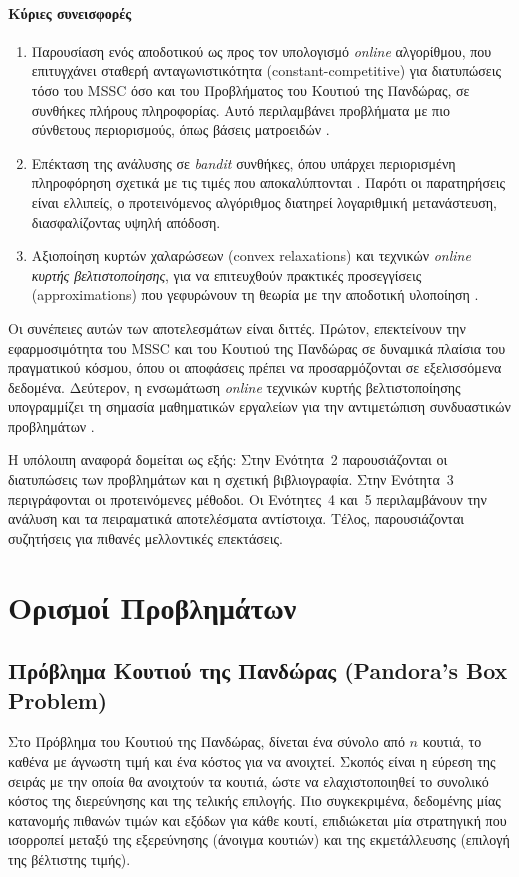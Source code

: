\documentclass[11pt,a4paper]{article}
\begin{document}
\paragraph{Κύριες συνεισφορές}
\begin{enumerate}
    \item Παρουσίαση ενός αποδοτικού ως προς τον υπολογισμό \textit{online} αλγορίθμου, που επιτυγχάνει σταθερή ανταγωνιστικότητα (constant-competitive) για διατυπώσεις τόσο του MSSC όσο και του Προβλήματος του Κουτιού της Πανδώρας, σε συνθήκες πλήρους πληροφορίας. Αυτό περιλαμβάνει προβλήματα με πιο σύνθετους περιορισμούς, όπως βάσεις ματροειδών \cite{bansal2010constant}.
    \item Επέκταση της ανάλυσης σε \textit{bandit} συνθήκες, όπου υπάρχει περιορισμένη πληροφόρηση σχετικά με τις τιμές που αποκαλύπτονται \cite{flaxman2004online}. Παρότι οι παρατηρήσεις είναι ελλιπείς, ο προτεινόμενος αλγόριθμος διατηρεί λογαριθμική μετανάστευση, διασφαλίζοντας υψηλή απόδοση.
    \item Αξιοποίηση κυρτών χαλαρώσεων (convex relaxations) και τεχνικών \textit{online κυρτής βελτιστοποίησης}, για να επιτευχθούν πρακτικές προσεγγίσεις (approximations) που γεφυρώνουν τη θεωρία με την αποδοτική υλοποίηση \cite{shalev2007primal}.
\end{enumerate}

Οι συνέπειες αυτών των αποτελεσμάτων είναι διττές. Πρώτον, επεκτείνουν την εφαρμοσιμότητα του MSSC και του Κουτιού της Πανδώρας σε δυναμικά πλαίσια του πραγματικού κόσμου, όπου οι αποφάσεις πρέπει να προσαρμόζονται σε εξελισσόμενα δεδομένα. Δεύτερον, η ενσωμάτωση \textit{online} τεχνικών κυρτής βελτιστοποίησης υπογραμμίζει τη σημασία μαθηματικών εργαλείων για την αντιμετώπιση συνδυαστικών προβλημάτων \cite{gergatsouli2022online}.

Η υπόλοιπη αναφορά δομείται ως εξής: Στην Ενότητα~2 παρουσιάζονται οι διατυπώσεις των προβλημάτων και η σχετική βιβλιογραφία. Στην Ενότητα~3 περιγράφονται οι προτεινόμενες μέθοδοι. Οι Ενότητες~4 και~5 περιλαμβάνουν την ανάλυση και τα πειραματικά αποτελέσματα αντίστοιχα. Τέλος, παρουσιάζονται συζητήσεις για πιθανές μελλοντικές επεκτάσεις.

\pagebreak

\section{Ορισμοί Προβλημάτων}
\subsection{Πρόβλημα Κουτιού της Πανδώρας (Pandora’s Box Problem)}
Στο Πρόβλημα του Κουτιού της Πανδώρας, δίνεται ένα σύνολο από \( n \) κουτιά, το καθένα με άγνωστη τιμή και ένα κόστος για να ανοιχτεί. Σκοπός είναι η εύρεση της σειράς με την οποία θα ανοιχτούν τα κουτιά, ώστε να ελαχιστοποιηθεί το συνολικό κόστος της διερεύνησης και της τελικής επιλογής. Πιο συγκεκριμένα, δεδομένης μίας κατανομής πιθανών τιμών και εξόδων για κάθε κουτί, επιδιώκεται μία στρατηγική που ισορροπεί μεταξύ της εξερεύνησης (άνοιγμα κουτιών) και της εκμετάλλευσης (επιλογή της βέλτιστης τιμής).
\end{document}

